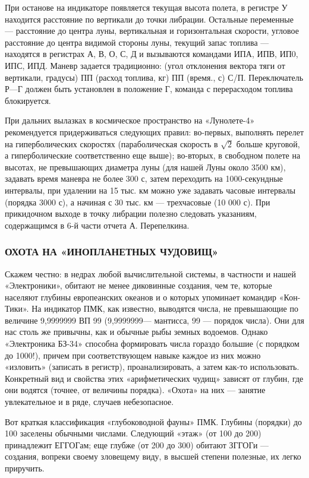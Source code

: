 \documentclass[11pt,a4paper,oneside]{article}
\begin{document}
При останове на индикаторе появляется текущая высота полета, в регистре У находится расстояние по вертикали до точки либрации. Остальные переменные — расстояние до центра луны, вертикальная и горизонтальная скорости, угловое расстояние до центра видимой стороны луны, текущий запас топлива — находятся в регистрах А, В, О, С, Д и вызываются командами ИПА, ИПВ, ИП0, ИПС, ИПД. Маневр задается традиционно: (угол отклонения вектора тяги от вертикали, градусы) ПП (расход топлива, кг) ПП (время., с) С/П. Переключатель Р—Г должен быть установлен в положение Г, команда с перерасходом топлива блокируется.

При дальних вылазках в космическое пространство на «Лунолете-4» рекомендуется придерживаться следующих правил: во-первых, выполнять перелет на гиперболических скоростях (параболическая скорость в $\sqrt{2}$ больше круговой, а гиперболические соответственно еще выше); во-вторых, в свободном полете на высотах, не превышающих диаметра луны (для нашей Луны около 3500 км), задавать время маневра не более 300 с, затем переходить на 1000-секундные интервалы, при удалении на 15 тыс. км
можно уже задавать часовые интервалы (порядка 3000 с), а начиная с 30 тыс. км — трехчасовые (10 000 с). При прикидочном выходе в точку либрации полезно следовать указаниям, содержащимся в 6-й части отчета А. Перепелкина.

\subsubsection{ОХОТА НА «ИНОПЛАНЕТНЫХ ЧУДОВИЩ»}

Скажем честно: в недрах любой вычислительной системы, в частности и нашей «Электроники», обитают не менее диковинные создания, чем те, которые населяют глубины европеанских океанов и о которых упоминает командир «Кон-Тики». На индикатор ПМК, как известно, выводятся числа, не превышающие по величине 9,9999999 ВП 99 (9,9999999— мантисса, 99 — порядок числа). Они для нас столь же привычны, как и обычные рыбы земных водоемов. Однако «Электроника БЗ-34» способна формировать числа гораздо большие (с порядком до 1000!), причем при соответствующем навыке каждое из них можно «изловить» (записать в регистр), проанализировать, а затем как-то использовать. Конкретный вид и свойства этих «арифметических чудищ» зависят от глубин, где они водятся (точнее, от величины порядка). «Охота» на них — занятие увлекательное и в ряде, случаев небезопасное.

Вот краткая классификация «глубоководной фауны» ПМК. Глубины (порядки) до 100 заселены обычными числами. Следующий «этаж» (от 100 до 200) принадлежит ЕГГОГам; еще глубже (от 200 до 300) обитают ЗГГОГи — создания, вопреки своему зловещему виду, в высшей степени полезные, их легко приручить.
\end{document}

